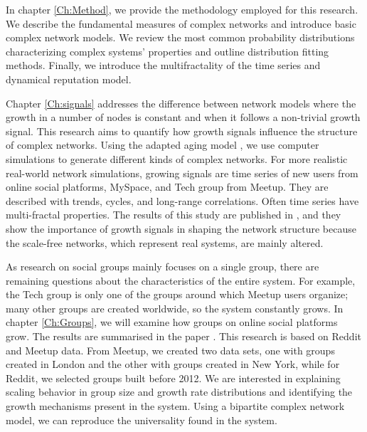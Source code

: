 In chapter \ref{Ch:Method}, we provide the methodology employed for this research. We describe the fundamental measures of complex networks and introduce basic complex network models. We review the most common probability distributions characterizing complex systems' properties and outline distribution fitting methods. Finally, we introduce the multifractality of the time series and dynamical reputation model. 

Chapter \ref{Ch:signals} addresses the difference between network models where the growth in a number of nodes is constant and when it follows a non-trivial growth signal. This research aims to quantify how growth signals influence the structure of complex networks. Using the adapted aging model \cite{hajra2004}, we use computer simulations to generate different kinds of complex networks. For more realistic real-world network simulations, growing signals are time series of new users from online social platforms, MySpace, and Tech group from Meetup. They are described with trends, cycles, and long-range correlations. Often time series have multi-fractal properties. The results of this study are published in \cite{vranic2021growth}, and they show the importance of growth signals in shaping the network structure because the scale-free networks, which represent real systems, are mainly altered. 

As research on social groups mainly focuses on a single group, there are remaining questions about the characteristics of the entire system. For example, the Tech group is only one of the groups around which Meetup users organize; many other groups are created worldwide, so the system constantly grows. In chapter \ref{Ch:Groups}, we will examine how groups on online social platforms grow. The results are summarised in the paper  \cite{vranic2022universal}. This research is based on Reddit and Meetup data. From Meetup, we created two data sets, one with groups created in London and the other with groups created in New York, while for Reddit, we selected groups built before 2012. We are interested in explaining scaling behavior in group size and growth rate distributions and identifying the growth mechanisms present in the system. Using a bipartite complex network model, we can reproduce the universality found in the system.

